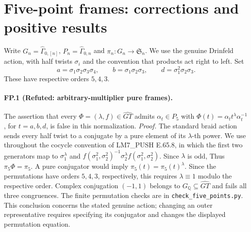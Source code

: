 \section*{Five-point frames: corrections and positive results}
Write $G_n=\widehat\Gamma_{0,[n]}$, $P_n=\widehat\Gamma_{0,n}$ and
$\pi_n:G_n\to\mathfrak S_n$. We use the genuine Drinfeld action, with
half twists $\sigma_i$ and the convention that products act right to left.
Set
\[
 a=\sigma_1\sigma_2\sigma_3\sigma_4,\qquad
 b=\sigma_1\sigma_2\sigma_3,\qquad
 d=\sigma_1^2\sigma_2\sigma_3.
\]
These have respective orders $5,4,3$.

\paragraph{FP.1 (Refuted: arbitrary-multiplier pure frames).}
The assertion that every $\Phi=(\lambda,f)\in\widehat{GT}$ admits
$\alpha_t\in P_5$ with $\Phi(t)=\alpha_t t^\lambda\alpha_t^{-1}$, for
$t=a,b,d$, is false in this normalization.
\emph{Proof.} The standard braid action sends every half twist to a conjugate by a
pure element of its $\lambda$-th power. We use throughout the cocycle
convention of LM7\_PUSH E.65.8, in which the first two generators map to
$\sigma_1^\lambda$ and
$f(\sigma_1^2,\sigma_2^2)^{-1}\sigma_2^\lambda
f(\sigma_1^2,\sigma_2^2)$. Since $\lambda$ is odd, Thus
$\pi_5\Phi=\pi_5$. A pure conjugator would imply
$\pi_5(t)=\pi_5(t)^\lambda$. Since the permutations have orders
$5,4,3$, respectively, this requires $\lambda\equiv1$ modulo the
respective order. Complex conjugation $(-1,1)$ belongs to
$G_{\mathbb Q}\subseteq\widehat{GT}$ and fails all three congruences.
The finite permutation checks are in \texttt{check\_five\_points.py}.
This conclusion concerns the stated genuine action; changing an outer
representative requires specifying its conjugator and changes the displayed
permutation equation.

